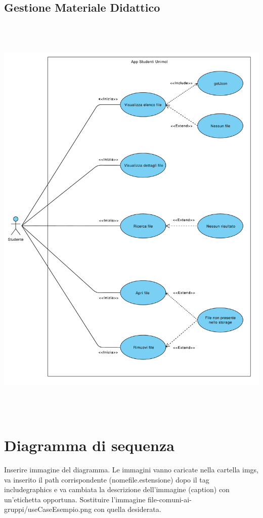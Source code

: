 \subsection{Gestione Materiale Didattico}
\begin{center}
	\includegraphics[height=8in]{imgs/gruppo1/UCD-materiale_didattico.pdf}
\end{center}
\newpage




\section{Diagramma di sequenza}

Inserire immagine del diagramma. Le immagini vanno caricate nella cartella imgs, va inserito il path corrispondente (nomefile.estensione) dopo il tag includegraphics e va cambiata la descrizione dell'immagine (caption) con un'etichetta opportuna. Sostituire l'immagine file-comuni-ai-gruppi/useCaseEsempio.png con quella desiderata. \\

